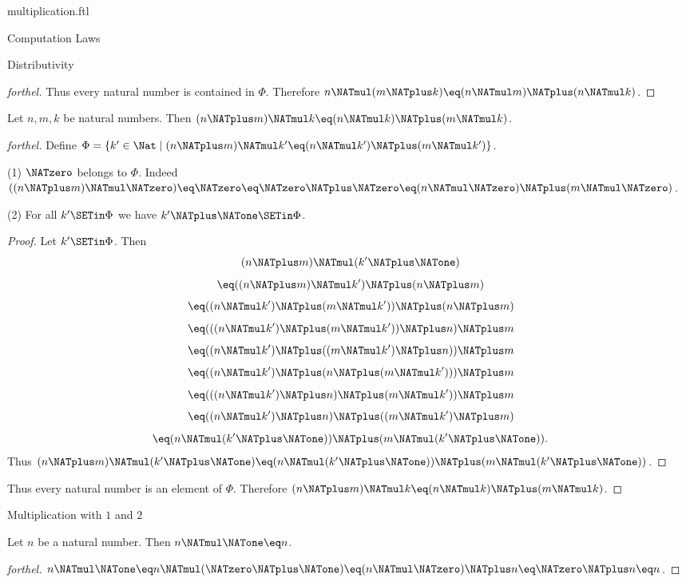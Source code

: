 \documentclass{stex}
\begin{document}
\begin{smodule}{multiplication.ftl}
\begin{sfragment}{Computation Laws}
\begin{sfragment}{Distributivity}
\begin{proof}[forthel]
      Thus every natural number is contained in $\Phi$.
      Therefore $n \NATmul (m \NATplus k) \eq (n \NATmul m) \NATplus (n \NATmul k)$.
    \end{proof}

    \begin{proposition}[forthel,id=ARITHMETIC_06_5742967566368768]
      Let $n, m, k$ be natural numbers.
      Then $(n \NATplus m) \NATmul k \eq (n \NATmul k) \NATplus (m \NATmul k)$.
    \end{proposition}
    \begin{proof}[forthel]
      Define $\Phi = \{ k' \in \Nat \mid (n \NATplus m) \NATmul k' \eq (n \NATmul k') \NATplus (m \NATmul k') \}$.

      (1) $\NATzero$ belongs to $\Phi$.
      Indeed $((n \NATplus m) \NATmul \NATzero)
        \eq \NATzero
        \eq \NATzero \NATplus \NATzero
        \eq (n \NATmul \NATzero) \NATplus (m \NATmul \NATzero)$.

      (2) For all $k' \SETin \Phi$ we have $k' \NATplus \NATone \SETin \Phi$.
      \begin{proof}
        Let $k' \SETin \Phi$.
        Then
        \[  (n \NATplus m) \NATmul (k' \NATplus \NATone)                        \]
        \[    \eq ((n \NATplus m) \NATmul k') \NATplus (n \NATplus m)              \]
        \[    \eq ((n \NATmul k') \NATplus (m \NATmul k')) \NATplus (n \NATplus m)   \]
        \[    \eq (((n \NATmul k') \NATplus (m \NATmul k')) \NATplus n) \NATplus m   \]
        \[    \eq ((n \NATmul k') \NATplus ((m \NATmul k') \NATplus n)) \NATplus m   \]
        \[    \eq ((n \NATmul k') \NATplus (n \NATplus (m \NATmul k'))) \NATplus m   \]
        \[    \eq (((n \NATmul k') \NATplus n) \NATplus (m \NATmul k')) \NATplus m   \]
        \[    \eq ((n \NATmul k') \NATplus n) \NATplus ((m \NATmul k') \NATplus m)   \]
        \[    \eq (n \NATmul (k' \NATplus \NATone)) \NATplus (m \NATmul (k' \NATplus \NATone)).  \]
        Thus $(n \NATplus m) \NATmul (k' \NATplus \NATone) \eq (n \NATmul (k' \NATplus \NATone)) \NATplus (m \NATmul (k' \NATplus \NATone))$.
      \end{proof}

      Thus every natural number is an element of $\Phi$.
      Therefore $(n \NATplus m) \NATmul k \eq (n \NATmul k) \NATplus (m \NATmul k)$.
    \end{proof}
  \end{sfragment}

  \begin{sfragment}{Multiplication with $1$ and $2$}
    \begin{proposition}[forthel,id=ARITHMETIC_06_2910559821365248]
      Let $n$ be a natural number.
      Then $n \NATmul \NATone \eq n$.
    \end{proposition}
    \begin{proof}[forthel]
      $n \NATmul \NATone
        \eq n \NATmul (\NATzero \NATplus \NATone)
        \eq (n \NATmul \NATzero) \NATplus n
        \eq \NATzero \NATplus n
        \eq n$.
    \end{proof}


\end{sfragment}
\end{sfragment}
\end{smodule}
\end{document}
